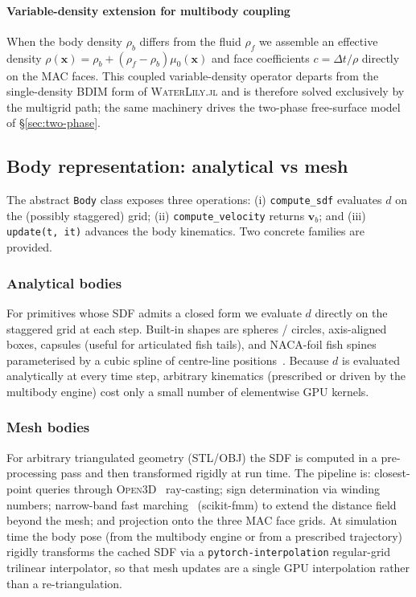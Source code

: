 \documentclass[journal,twoside,10pt]{IEEEtran}
\newcommand{\waterlily}{\textsc{WaterLily.jl}\xspace}
\begin{document}
\paragraph{Variable-density extension for multibody coupling}  When the
body density $\rho_b$ differs from the fluid $\rho_f$ we assemble an
effective density
$\rho(\mathbf x)=\rho_b+(\rho_f-\rho_b)\mu_0(\mathbf x)$ and face
coefficients $c=\Delta t/\rho$ directly on the MAC faces.  This
coupled variable-density operator departs from the single-density
BDIM form of \waterlily and is therefore solved exclusively by the
multigrid path; the same machinery drives the two-phase free-surface
model of §\ref{sec:two-phase}.


\subsection{Body representation: analytical vs mesh}\label{sec:bodies}

The abstract \texttt{Body} class exposes three operations:
(i) \texttt{compute\_sdf} evaluates $d$ on the (possibly staggered)
grid; (ii) \texttt{compute\_velocity} returns $\mathbf v_b$; and
(iii) \texttt{update(t, it)} advances the body kinematics.  Two
concrete families are provided.

\subsubsection{Analytical bodies}  For primitives whose SDF admits a
closed form we evaluate $d$ directly on the staggered grid at each
step.  Built-in shapes are spheres / circles, axis-aligned boxes,
capsules (useful for articulated fish tails), and NACA-foil fish
spines parameterised by a cubic spline of centre-line
positions~\cite{kern2006simulations}.  Because $d$ is evaluated
analytically at every time step, arbitrary kinematics (prescribed or
driven by the multibody engine) cost only a small number of elementwise GPU
kernels.

\subsubsection{Mesh bodies}  For arbitrary
triangulated geometry (STL/OBJ) the SDF is computed in a
pre-processing pass and then transformed rigidly at run time.  The
pipeline is: closest-point queries through
\textsc{Open3D}~\cite{zhou2018open3d} ray-casting; sign determination
via winding numbers; narrow-band fast
marching~\cite{sethian1996fastmarch} (scikit-fmm) to extend the
distance field beyond the mesh; and projection onto the three MAC
face grids.  At simulation time the body pose (from the multibody
engine or from a prescribed trajectory) rigidly transforms the cached SDF via a
\texttt{pytorch-interpolation} regular-grid trilinear interpolator,
so that mesh updates are a single GPU interpolation rather than a
re-triangulation.
\end{document}
